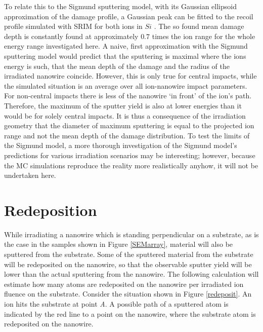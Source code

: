 To relate this to the Sigmund sputtering model, with its Gaussian ellipsoid approximation of the damage profile, a Gaussian peak can be fitted to the recoil profile simulated with SRIM for both ions in $Si$ \cite{bobes_ion_2012}. The so found mean damage depth is constantly found at approximately $0.7$ times the ion range for the whole energy range investigated here. A naive, first approximation with the Sigmund sputtering model would predict that the sputtering is maximal where the ions energy is such, that the mean depth of the damage and the radius of the irradiated nanowire coincide. However, this is only true for central impacts, while the simulated situation is an average over all ion-nanowire impact parameters. For non-central impacts there is less of the nanowire `in front' of the ion's path. Therefore, the maximum of the sputter yield is also at lower energies than it would be for solely central impacts. It is thus a consequence of the irradiation geometry that the diameter of maximum sputtering is equal to the projected ion range and not the mean depth of the damage distribution. To test the limits of the Sigmund model, a more thorough investigation of the Sigmund model's predictions for various irradiation scenarios may be interesting; however, because the MC simulations reproduce the reality more realistically anyhow, it will not be undertaken here.


\vfill
\section{Redeposition}
\label{sec:redeposition}

While irradiating a nanowire which is standing perpendicular on a substrate, as is the case in the samples shown in Figure \ref{SEMarray}, material will also be sputtered from the substrate. Some of the sputtered material from the substrate will be redeposited on the nanowire, so that the observable sputter yield will be lower than the actual sputtering from the nanowire. The following calculation will estimate how many atoms are redeposited on the nanowire per irradiated ion fluence on the substrate. Consider the situation shown in Figure \ref{redeposit}. An ion hits the substrate at point \emph{A}. A possible path of a sputtered atom is indicated by the red line to a point on the nanowire, where the substrate atom is redeposited on the nanowire. 

